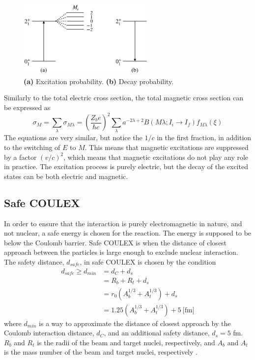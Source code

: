 \documentclass[twoside,english]{uiofysmaster/uiofysmaster}
\begin{document}
\begin{figure}[htb]
	\centering
	\includegraphics[width=0.6\textwidth]{Images/transitions.png}
	\caption{\textbf{(a)} Excitation probability. \textbf{(b)} Decay probability.}
	\label{fig:transitions}
\end{figure}

Similarly to the total electric cross section, the total magnetic cross section can be expressed as \cite{EE-Coulex}
\begin{equation}
	\sigma_M = \sum_\lambda \sigma_{M \lambda} = \left( \frac{Z_b e}{\hbar c} \right)^2 \sum_\lambda a^{-2 \lambda + 2} B(M \lambda; I_i \rightarrow I_f) f_{M \lambda} (\xi)
\end{equation}
The equations are very similar, but notice the $1/c$ in the first fraction, in addition to the switching of $E$ to $M$.
This means that magnetic excitations are suppressed by a factor $(v/c)^2$, which means that magnetic excitations do not play any role in practice.
The excitation process is purely electric, but the decay of the excited states can be both electric and magnetic.


\subsection{Safe COULEX}
In order to ensure that the interaction is purely electromagnetic in nature, and not nuclear, a safe energy is chosen for the reaction. 
The energy is supposed to be below the Coulomb barrier.
Safe COULEX is when the distance of closest approach between the particles is large enough to exclude nuclear interaction.
The safety distance, $d_{safe}$, in safe COULEX is chosen by the condition
\begin{align}
	d_{safe} \geq d_{min} &= d_C + d_s \nonumber \\
	&= R_b + R_t + d_s \nonumber \\
	&= r_0 (A_b^{1/3} + A_t^{1/3}) + d_s \nonumber \\
	&= 1.25 (A_b^{1/3} + A_t^{1/3}) + 5~\text{[fm]}
\end{align}
where $d_{min}$ is a way to approximate the distance of closest approach by the Coulomb interaction distance, $d_C$, and an additional safety distance, $d_s = 5$ fm.
$R_b$ and $R_t$ is the radii of the beam and target nuclei, respectively, and $A_b$ and $A_t$ is the mass number of the beam and target nuclei, respectively \cite{RBass, Cline1986}.
\end{document}
